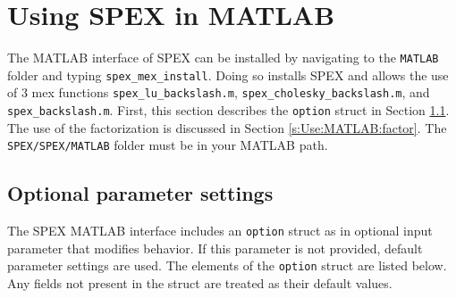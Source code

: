 \documentclass[12pt,oneside]{book}
\theoremstyle{definition}
\begin{document}
\chapter{Using SPEX in MATLAB}\vspace{-0.75in} \label{s:Use:MATLAB}
The MATLAB interface of SPEX can be installed by navigating to the \verb|MATLAB| folder and typing \verb|spex_mex_install|. 
Doing so installs SPEX and allows the use of 3 mex functions \verb|spex_lu_backslash.m|, \verb|spex_cholesky_backslash.m|, and \verb|spex_backslash.m|. First, this section describes the
\verb|option| struct in Section \ref{s:Use:MATLAB:setup}.
The use of the factorization is discussed in Section \ref{s:Use:MATLAB:factor}.
The \verb|SPEX/SPEX/MATLAB| folder must be in your MATLAB path.


\section{Optional parameter settings} \label{s:Use:MATLAB:setup}
The SPEX MATLAB interface includes an \verb|option| struct as in optional
input parameter that modifies behavior.  If this parameter is not provided,
default parameter settings are used.  The elements of the \verb'option' struct
are listed below.  Any fields not present in the struct are treated as their
default values.
\end{document}
